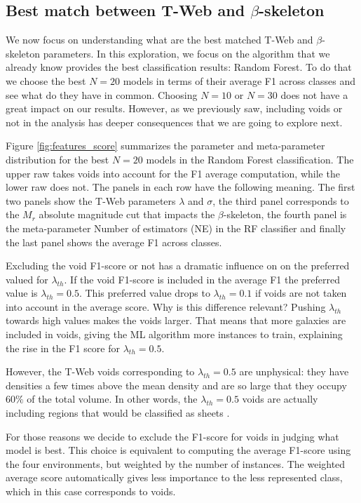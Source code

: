 \documentclass[usenatbib]{mnras}
\begin{document}
\subsection{Best match between T-Web and $\beta$-skeleton}

We now focus on understanding what are the best matched T-Web and
$\beta$-skeleton parameters.
In this exploration, we focus on the algorithm that we already know
provides the best classification results: Random Forest. 
To do that we choose the best $N=20$ models in terms of their average F1 across
classes and see what do they have in common.
Choosing $N=10$ or $N=30$ does not have a great impact on our
results. 
However, as we previously saw, including voids or not in the analysis
has deeper consequences that we are going to explore next.

Figure \ref{fig:features_score} summarizes the parameter and meta-parameter
distribution for the best $N=20$ models in the Random Forest
classification.
The upper raw takes voids into account for the F1 average computation,
while the lower raw does not.
The panels in each row have the following meaning.
The first two panels show the T-Web parameters
$\lambda$ and $\sigma$, the third panel corresponds to the $M_r$
absolute magnitude cut that impacts the $\beta$-skeleton, the fourth panel is the meta-parameter Number of estimators (NE) in the RF
classifier and finally the last panel shows the average F1 across classes. 

Excluding the void F1-score or not has a dramatic influence on
on the preferred valued for $\lambda_{th}$. 
If the void F1-score is included in the average F1 the preferred value is
$\lambda_{th}=0.5$. 
This preferred value drops to $\lambda_{th}=0.1$ if voids are not taken into account in the average score.
Why is this difference relevant?
Pushing $\lambda_{th}$ towards high values makes the voids larger.
That means that more galaxies are included in voids, giving the ML algorithm more instances to train, explaining the rise in the F1 score
for $\lambda_{th}=0.5$.


However, the T-Web voids corresponding to $\lambda_{th}=0.5$ are unphysical: they have densities a few times above the mean
density and are so large that they occupy $60\%$ of the total volume.
In other words, the $\lambda_{th}=0.5$ voids are actually including regions that would be classified as sheets
\citep{2015MNRAS.453..497B, Forero-Romero2009}. 


For those reasons we decide to exclude the F1-score for voids in
judging what model is best.
This choice is equivalent to computing the average F1-score using the
four environments, but weighted by the number of instances. 
The weighted average score automatically gives less importance to the
less represented class, which in this case corresponds to voids.
\end{document}
